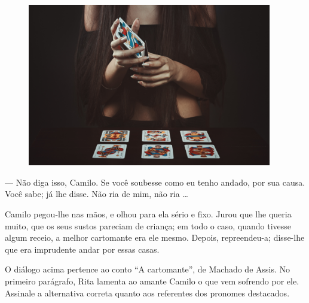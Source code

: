 
\begin{myquote}

\begin{figure}[H]
\centering
\includegraphics[width=0.95\textwidth]{./imgSAEB_7_POR/media/image63.png}
\end{figure}
--- Não diga isso, Camilo. Se você soubesse como eu tenho andado, por sua
causa. Você sabe; já lhe disse. Não ria de mim, não ria \ldots{}

Camilo pegou-lhe nas mãos, e olhou para ela sério e fixo. Jurou que lhe
queria muito, que os seus sustos pareciam de criança; em todo o caso,
quando tivesse algum receio, a melhor cartomante era ele mesmo. Depois,
repreendeu-a; disse-lhe que era imprudente andar por essas casas.

\end{myquote}


O diálogo acima pertence ao conto ``A cartomante'', de Machado de Assis.
No primeiro parágrafo, Rita lamenta ao amante Camilo o que vem 
sofrendo por ele. Assinale a alternativa correta quanto aos 
referentes dos pronomes destacados.

